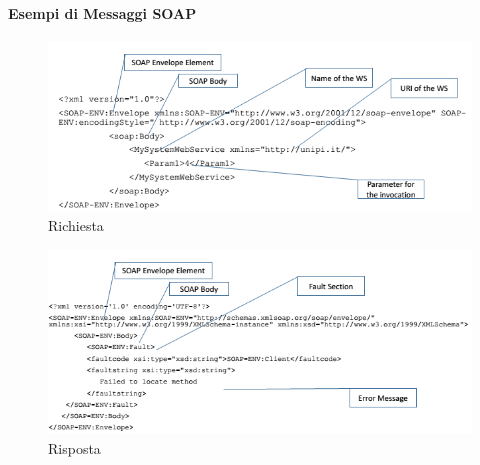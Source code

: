 \documentclass{article}
\begin{document}
\paragraph{Esempi di Messaggi SOAP}
\begin{figure}[H]
\centering
\includegraphics[scale=0.8]{img/soapRequest.png}
\caption{Richiesta}
\end{figure}

\begin{figure}[H]
\centering
\includegraphics[scale=0.8]{img/soapResponse.png}
\caption{Risposta}
\end{figure}
\end{document}
